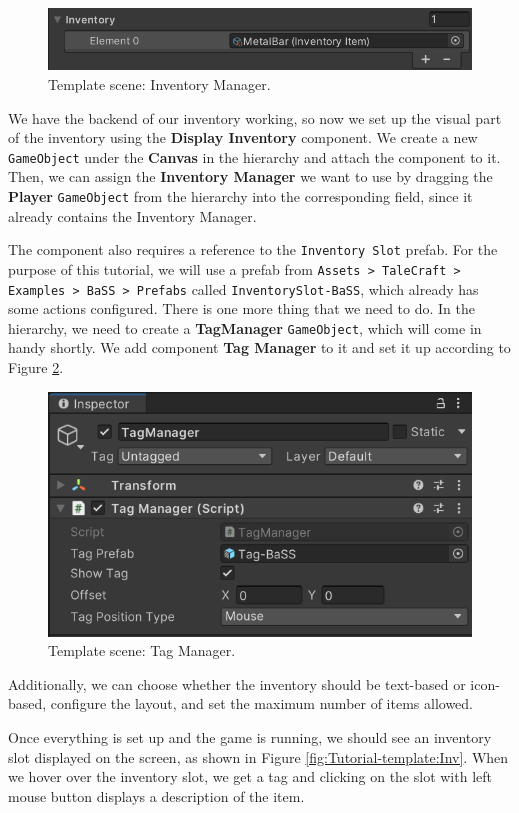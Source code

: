 \begin{figure}[H]
\centering
\includegraphics[width=0.7\linewidth]{img/User doc/image_2025-07-10_135818202.png}
\caption{Template scene: Inventory Manager.}
\label{fig:Tutorial-template:IM}
\end{figure}

We have the backend of our inventory working, so now we set up the visual part of the inventory using the \textbf{Display Inventory} component. We create a new \verb|GameObject| under the \textbf{Canvas} in the hierarchy and attach the component to it. Then, we can assign the \textbf{Inventory Manager} we want to use by dragging the \textbf{Player} \verb|GameObject| from the hierarchy into the corresponding field, since it already contains the Inventory Manager.

The component also requires a reference to the \texttt{Inventory Slot} prefab. For the purpose of this tutorial, we will use a prefab from \texttt{Assets > TaleCraft > Examples > BaSS > Prefabs} called \texttt{InventorySlot-BaSS}, which already has some actions configured. There is one more thing that we need to do. In the hierarchy, we need to create a \textbf{TagManager} \texttt{GameObject}, which will come in handy shortly. We add component \textbf{Tag Manager} to it and set it up according to Figure \ref{fig:Tutorial-template:TM}. 

\begin{figure}[H]
\centering
\includegraphics[width=0.6\linewidth]{img/User doc/image_2025-07-09_135233837.png}
\caption{Template scene: Tag Manager.}
\label{fig:Tutorial-template:TM}
\end{figure}

Additionally, we can choose whether the inventory should be text-based or icon-based, configure the layout, and set the maximum number of items allowed.

Once everything is set up and the game is running, we should see an inventory slot displayed on the screen, as shown in Figure \ref{fig:Tutorial-template:Inv}. When we hover over the inventory slot, we get a tag and clicking on the slot with left mouse button displays a description of the item.


